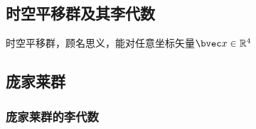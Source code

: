 
\subsection{时空平移群及其李代数}
时空平移群，顾名思义，能对任意坐标矢量$\bvec x\in \mathbb R^{4} $
\subsection{庞家莱群}
\subsubsection{庞家莱群的李代数}